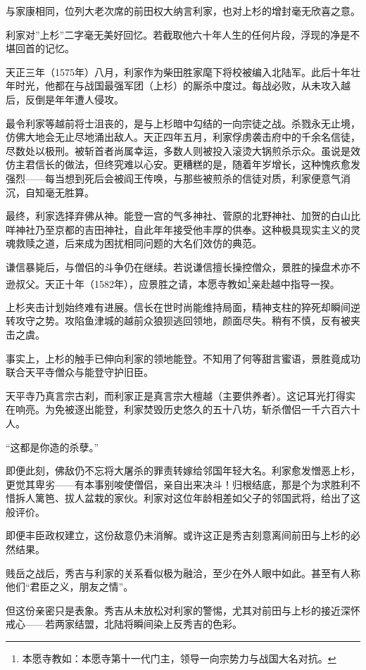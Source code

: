 \documentclass[
]{book}
\begin{document}
与家康相同，位列大老次席的前田权大纳言利家，也对上杉的增封毫无欣喜之意。

利家对''上杉''二字毫无美好回忆。若截取他六十年人生的任何片段，浮现的净是不堪回首的记忆。

天正三年（1575年）八月，利家作为柴田胜家麾下将校被编入北陆军。此后十年壮年时光，他都在与战国最强军团（上杉）的厮杀中度过。每战必败，从未攻入越后，反倒是年年遭人侵攻。

最令利家等越前将士沮丧的，是与上杉暗中勾结的一向宗徒之战。杀戮永无止境，仿佛大地会无止尽地涌出敌人。天正四年五月，利家俘虏袭击府中的千余名信徒，尽数处以极刑。被斩首者尚属幸运，多数人则被投入滚烫大锅煎杀示众。虽说是效仿主君信长的做法，但终究难以心安。更糟糕的是，随着年岁增长，这种愧疚愈发强烈------每当想到死后会被阎王传唤，与那些被煎杀的信徒对质，利家便意气消沉，自知毫无胜算。

最终，利家选择弃佛从神。能登一宫的气多神社、菅原的北野神社、加贺的白山比咩神社乃至京都的吉田神社，自此年年接受他丰厚的供奉。这种极具现实主义的灵魂救赎之道，后来成为困扰相同问题的大名们效仿的典范。

谦信暴毙后，与僧侣的斗争仍在继续。若说谦信擅长操控僧众，景胜的操盘术亦不逊叔父。天正十年（1582年），应景胜之请，本愿寺教如\footnote{本愿寺教如：本愿寺第十一代门主，领导一向宗势力与战国大名对抗。}亲赴越中指导一揆。

上杉夹击计划始终难有进展。信长在世时尚能维持局面，精神支柱的猝死却瞬间逆转攻守之势。攻陷鱼津城的越前众狼狈逃回领地，颜面尽失。稍有不慎，反有被夹击之虞。

事实上，上杉的触手已伸向利家的领地能登。不知用了何等甜言蜜语，景胜竟成功联合天平寺僧众与能登守护旧臣。

天平寺乃真言宗古刹，而利家正是真言宗大檀越（主要供养者）。这记耳光打得实在响亮。为免被逐出能登，利家焚毁历史悠久的五十八坊，斩杀僧侣一千六百六十人。

``这都是你造的杀孽。''

即便此刻，佛敌仍不忘将大屠杀的罪责转嫁给邻国年轻大名。利家愈发憎恶上杉，更觉其卑劣------有本事别唆使僧侣，亲自出来决斗！归根结底，那是个为求胜利不惜拆人篱笆、拔人盆栽的家伙。利家对这位年龄相差如父子的邻国武将，给出了这般评价。

即便丰臣政权建立，这份敌意仍未消解。或许这正是秀吉刻意离间前田与上杉的必然结果。

贱岳之战后，秀吉与利家的关系看似极为融洽，至少在外人眼中如此。甚至有人称他们``君臣之义，朋友之情''。

但这份亲密只是表象。秀吉从未放松对利家的警惕，尤其对前田与上杉的接近深怀戒心------若两家结盟，北陆将瞬间染上反秀吉的色彩。
\end{document}
